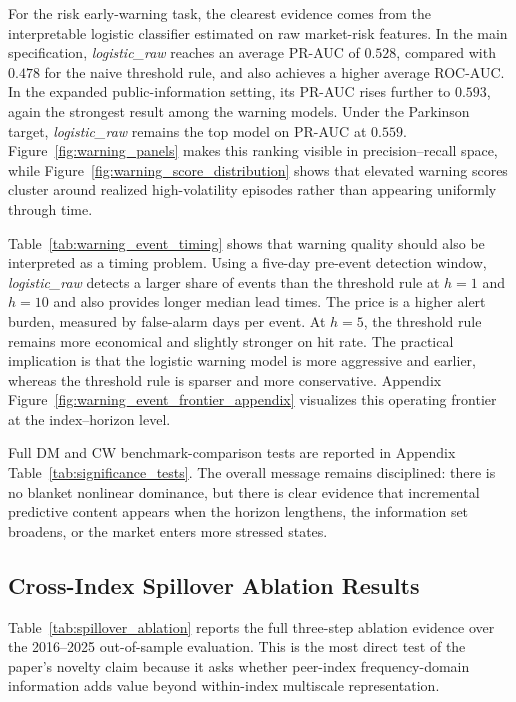For the risk early-warning task, the clearest evidence comes from the interpretable logistic classifier estimated on raw market-risk features. In the main specification, \textit{logistic\_raw} reaches an average PR-AUC of \(0.528\), compared with \(0.478\) for the naive threshold rule, and also achieves a higher average ROC-AUC. In the expanded public-information setting, its PR-AUC rises further to \(0.593\), again the strongest result among the warning models. Under the Parkinson target, \textit{logistic\_raw} remains the top model on PR-AUC at \(0.559\). Figure~\ref{fig:warning_panels} makes this ranking visible in precision--recall space, while Figure~\ref{fig:warning_score_distribution} shows that elevated warning scores cluster around realized high-volatility episodes rather than appearing uniformly through time.

Table~\ref{tab:warning_event_timing} shows that warning quality should also be interpreted as a timing problem. Using a five-day pre-event detection window, \textit{logistic\_raw} detects a larger share of events than the threshold rule at \(h=1\) and \(h=10\) and also provides longer median lead times. The price is a higher alert burden, measured by false-alarm days per event. At \(h=5\), the threshold rule remains more economical and slightly stronger on hit rate. The practical implication is that the logistic warning model is more aggressive and earlier, whereas the threshold rule is sparser and more conservative. Appendix Figure~\ref{fig:warning_event_frontier_appendix} visualizes this operating frontier at the index--horizon level.

Full DM and CW benchmark-comparison tests are reported in Appendix Table~\ref{tab:significance_tests}. The overall message remains disciplined: there is no blanket nonlinear dominance, but there is clear evidence that incremental predictive content appears when the horizon lengthens, the information set broadens, or the market enters more stressed states.

\subsection{Cross-Index Spillover Ablation Results}
\label{subsec:results_spillover}

Table~\ref{tab:spillover_ablation} reports the full three-step ablation evidence over the 2016--2025 out-of-sample evaluation. This is the most direct test of the paper's novelty claim because it asks whether peer-index frequency-domain information adds value beyond within-index multiscale representation.

